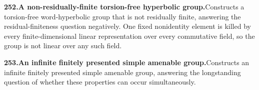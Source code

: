 \documentclass[11pt,a4paper]{article}
\begin{document}
  \par \begin{minipage}{\linewidth}
  \fontsize{10.5}{12.6}\selectfont\RaggedRight
  \hypertarget{result 252}{}
  {\bfseries\textcolor{muted}{252.}\enspace A non-residually-finite torsion-free hyperbolic group.}\enspace Constructs a torsion-free word-hyperbolic group that is not residually finite, answering the residual-finiteness question negatively. One fixed nonidentity element is killed by every finite-dimensional linear representation over every commutative field, so the group is not linear over any such field.\par
  \end{minipage}\par\vspace{5pt}



  \par \begin{minipage}{\linewidth}
  \fontsize{10.5}{12.6}\selectfont\RaggedRight
  \hypertarget{result 253}{}
  {\bfseries\textcolor{muted}{253.}\enspace An infinite finitely presented simple amenable group.}\enspace Constructs an infinite finitely presented simple amenable group, answering the longstanding question of whether these properties can occur simultaneously.\par
  \end{minipage}\par\vspace{5pt}
\end{document}
